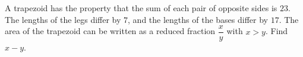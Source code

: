 A trapezoid has the property that the sum of each pair of opposite sides is $23$. The lengths of the legs differ by $7$, and the lengths of the bases differ by $17$. The area of the trapezoid can be written as a reduced fraction $\dfrac {x}{y}$ with $x>y$. Find $x-y$.
